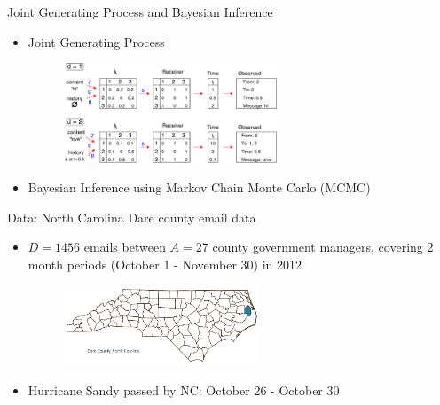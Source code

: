\documentclass[10pt]{beamer}
\def\bni{\begin{itemize}} \def\ei{\end{itemize}}
\theoremstyle{definition}
\theoremstyle{remark}
\begin{document}
\begin{frame}{Joint Generating Process and Bayesian Inference}
		\bni 
		\item Joint Generating Process
	\begin{figure}
		\includegraphics[width=0.6\textwidth]{figures/summary.pdf}
	\end{figure}	\vspace{0.1cm}
\item Bayesian Inference using Markov Chain Monte Carlo (MCMC)
  	\begin{center}
	 	\end{center}
	 		\ei
\end{frame}

\begin{frame}{Data: North Carolina Dare county email data}
 \bni \item $D = 1456$ emails between $A = 27$ county government managers, covering 2 month periods (October 1 - November 30) in 2012
 \begin{figure}
 	\includegraphics[width=0.55\textwidth]{figures/Dare.png}
 \end{figure}	
\vspace{0.4cm}
 \item Hurricane Sandy passed by NC: October 26 - October 30
 \ei
\end{frame}
\end{document}
